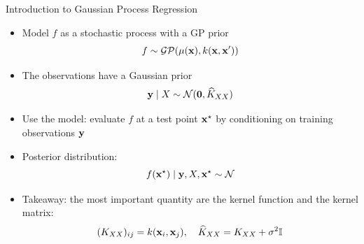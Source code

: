 \documentclass{beamer}
\begin{document}
\begin{frame}{Introduction to Gaussian Process Regression}
\begin{itemize}[<+->]
    \item Model $f$ as a stochastic process with a GP prior
    \begin{equation*}
        f \sim \mathcal{GP}(\mu(\boldsymbol{\mathbf{x}}), k(\boldsymbol{\mathbf{x}}, \boldsymbol{\mathbf{x}}'))
    \end{equation*}
    \item The observations have a Gaussian prior
    \begin{equation*}
        \boldsymbol{\mathbf{y}} \mid X \sim \mathcal N(\boldsymbol{\mathbf{0}}, \widehat K_{XX})
    \end{equation*}
    \item Use the model: evaluate $f$ at a test point $\boldsymbol{\mathbf{x}}^\star$ by conditioning on training observations $\boldsymbol{\mathbf{y}}$
    \item Posterior distribution: 
    \begin{equation*}
        f(\boldsymbol{\mathbf{x}}^\star) \mid \boldsymbol{\mathbf{y}}, X, \boldsymbol{\mathbf{x}}^\star \sim \mathcal N
    \end{equation*}
    \item Takeaway: the most important quantity are the kernel function and the kernel matrix:
    \begin{equation*}
        (K_{XX})_{ij} = k(\vect x_i, \vect x_j), \quad \widehat K_{XX} = K_{XX} + \sigma^2 \Id
    \end{equation*}
\end{itemize}
\end{frame}
\end{document}
